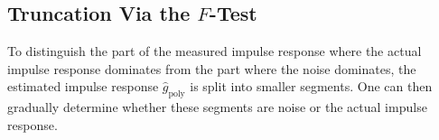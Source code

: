 \subsection{Truncation Via the $F$-Test}
\label{sec:nonparametric:truncation:ftest}
To distinguish the part of the measured impulse response where the actual impulse response dominates from the part where the noise dominates, the estimated impulse response $\hat{g}_\mathrm{poly}$ is split into smaller segments. 
One can then gradually determine whether these segments are noise or the actual impulse response.


